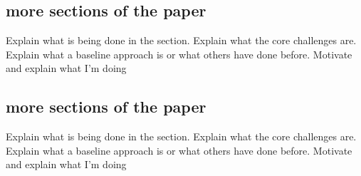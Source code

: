 \subsection{more sections of the paper}
Explain what is being done in the section. Explain what the core challenges are. Explain what a baseline approach is or what others have done before. Motivate and explain what I'm doing

\subsection{more sections of the paper}
Explain what is being done in the section. Explain what the core challenges are. Explain what a baseline approach is or what others have done before. Motivate and explain what I'm doing
